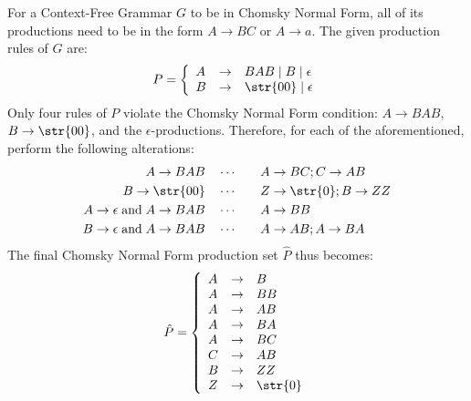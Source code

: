 For a Context-Free Grammar $G$ to be in Chomsky Normal Form, all of its productions need to be in the form $A \rightarrow BC$ or $A \rightarrow a$. The given production rules of $G$ are:
\begin{equation*}
	P = \left\{ \begin{array}{lcl}
		A & \rightarrow & BAB \mid B \mid \epsilon \\
		B & \rightarrow & \str{00} \mid \epsilon
	\end{array} \right.
\end{equation*}
Only four rules of $P$ violate the Chomsky Normal Form condition: $A \rightarrow BAB$, $B \rightarrow \str{00}$, and the $\epsilon$-productions. Therefore, for each of the aforementioned, perform the following alterations:
\begin{alignat*}{3}
	A \rightarrow BAB & \quad \cdots \quad && A \rightarrow BC; C \rightarrow AB \\
	B \rightarrow \str{00} & \quad \cdots \quad && Z \rightarrow \str{0}; B \rightarrow ZZ \\
	A \rightarrow \epsilon \; \text{and} \; A \rightarrow BAB & \quad \cdots \quad && A \rightarrow BB \\
	B \rightarrow \epsilon  \; \text{and} \; A \rightarrow BAB & \quad \cdots \quad && A \rightarrow AB; A \rightarrow BA
\end{alignat*}
The final Chomsky Normal Form production set $\hat{P}$ thus becomes:
\begin{equation*}
	\hat{P} = \left\{ \begin{array}{lcl}
		A & \rightarrow & B \\
		A & \rightarrow & BB \\
		A & \rightarrow & AB \\
		A & \rightarrow & BA \\
		A & \rightarrow & BC \\
		C & \rightarrow & AB \\
		B & \rightarrow & ZZ \\
		Z & \rightarrow & \str{0} \\
	\end{array} \right.
\end{equation*}